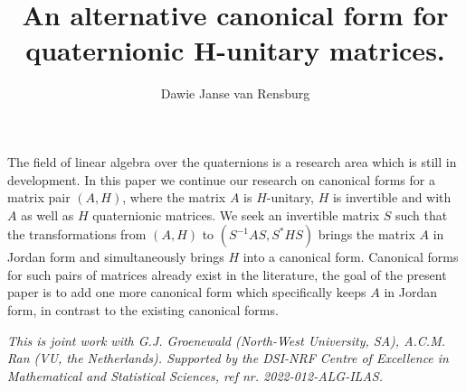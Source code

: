 \documentclass[a4paper]{amsart}
\date{}
\begin{document}
\title{An alternative canonical form for quaternionic H-unitary matrices.}
\author{Dawie Janse van Rensburg} %
\address{North-West University, Potchefstroom, South Africa.} %

\maketitle


The field of linear algebra over the quaternions is a research area which is still in development. In this paper we continue our research on canonical forms for a matrix pair $(A, H)$, where the matrix $A$ is $H$-unitary, $H$ is invertible and with $A$ as well as $H$ quaternionic matrices. We seek an invertible matrix $S$ such that the transformations from $(A, H)$ to 
$(S^{-1}AS, S^*HS)$
brings the matrix $A$ in Jordan form and simultaneously brings $H$ into a canonical form. Canonical forms for such pairs of matrices already exist in the literature, the goal of the present paper is to add one more canonical form which specifically keeps $A$ in Jordan form, in contrast to the existing canonical forms.

\emph{This is joint work with G.J. Groenewald (North-West University, SA), A.C.M. Ran (VU, the Netherlands).
Supported by the DSI-NRF Centre of Excellence in Mathematical and Statistical Sciences, ref nr. 2022-012-ALG-ILAS.}


\end{document}
